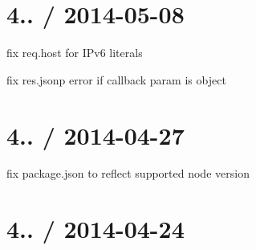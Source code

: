 {\ttfamily \section*{4.. / 2014-\/05-\/08 }}

{\ttfamily }

{\ttfamily 
\begin{DoxyItemize}
\item fix {\ttfamily req.\+host} for I\+Pv6 literals
\item fix {\ttfamily res.\+jsonp} error if callback param is object
\end{DoxyItemize}}

{\ttfamily \section*{4.. / 2014-\/04-\/27 }}

{\ttfamily }

{\ttfamily 
\begin{DoxyItemize}
\item fix package.\+json to reflect supported node version
\end{DoxyItemize}}

{\ttfamily \section*{4.. / 2014-\/04-\/24 }}

{\ttfamily }

